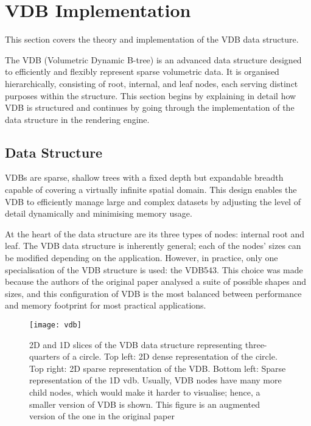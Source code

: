\section{VDB Implementation}\label{vdb:sec}

This section covers the theory and implementation of the VDB data structure.

The VDB (Volumetric Dynamic B-tree) is an advanced data structure designed to efficiently and flexibly represent sparse volumetric data. It is organised hierarchically, consisting of root, internal, and leaf nodes, each serving distinct purposes within the structure. This section begins by explaining in detail how VDB is structured and continues by going through the implementation of the data structure in the rendering engine.

\subsection{Data Structure}
\label{vdb:ds}

VDBs are sparse, shallow trees with a fixed depth but expandable breadth capable of covering a virtually infinite spatial domain. This design enables the VDB to efficiently manage large and complex datasets by adjusting the level of detail dynamically and minimising memory usage.

At the heart of the data structure are its three types of nodes: internal root and leaf. The VDB data structure is inherently general; each of the nodes' sizes can be modified depending on the application. However, in practice, only one specialisation of the VDB structure is used: the VDB543. This choice was made because the authors of the original paper\supercite{vdb2013} analysed a suite of possible shapes and sizes, and this configuration of VDB is the most balanced between performance and memory footprint for most practical applications.

\begin{figure}[H]
  \centering
  \vspace{-1cm}
  \texttt{[image: vdb]}
  \vspace*{-2cm}
  \caption[2D and 1D VDB structure]{2D and 1D slices of the VDB data structure representing three-quarters of a circle. Top left: 2D dense representation of the circle. Top right: 2D sparse representation of the VDB. Bottom left: Sparse representation of the 1D vdb. Usually, VDB nodes have many more child nodes, which would make it harder to visualise; hence, a smaller version of VDB is shown. This figure is an augmented version of the one in the original paper\supercite{vdb2013}}
\end{figure}

